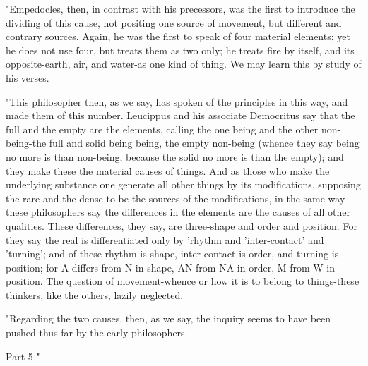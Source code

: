 "Empedocles, then, in contrast with his precessors, was the first
to introduce the dividing of this cause, not positing one source of
movement, but different and contrary sources. Again, he was the first
to speak of four material elements; yet he does not use four, but
treats them as two only; he treats fire by itself, and its opposite-earth,
air, and water-as one kind of thing. We may learn this by study of
his verses. 

"This philosopher then, as we say, has spoken of the principles in
this way, and made them of this number. Leucippus and his associate
Democritus say that the full and the empty are the elements, calling
the one being and the other non-being-the full and solid being being,
the empty non-being (whence they say being no more is than non-being,
because the solid no more is than the empty); and they make these
the material causes of things. And as those who make the underlying
substance one generate all other things by its modifications, supposing
the rare and the dense to be the sources of the modifications, in
the same way these philosophers say the differences in the elements
are the causes of all other qualities. These differences, they say,
are three-shape and order and position. For they say the real is differentiated
only by 'rhythm and 'inter-contact' and 'turning'; and of these rhythm
is shape, inter-contact is order, and turning is position; for A differs
from N in shape, AN from NA in order, M from W in position. The question
of movement-whence or how it is to belong to things-these thinkers,
like the others, lazily neglected. 

"Regarding the two causes, then, as we say, the inquiry seems to have
been pushed thus far by the early philosophers. 

Part 5 "

